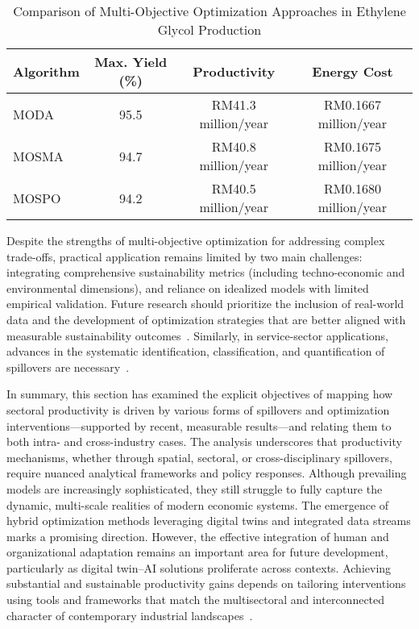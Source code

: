 \documentclass[sigconf]{acmart}
\begin{document}
\begin{table*}[htbp]
\centering
\caption{Comparison of Multi-Objective Optimization Approaches in Ethylene Glycol Production}
\label{tab:ethylene_glycol_optimization}
\begin{adjustbox}{max width=\textwidth}
\begin{tabular}{lccc}
\toprule
\textbf{Algorithm} & \textbf{Max. Yield (\%)} & \textbf{Productivity} & \textbf{Energy Cost} \\
\midrule
MODA  & 95.5 & RM41.3 million/year & RM0.1667 million/year \\
MOSMA & 94.7 & RM40.8 million/year & RM0.1675 million/year \\
MOSPO & 94.2 & RM40.5 million/year & RM0.1680 million/year \\
\bottomrule
\end{tabular}
\end{adjustbox}
\end{table*}

Despite the strengths of multi-objective optimization for addressing complex trade-offs, practical application remains limited by two main challenges: integrating comprehensive sustainability metrics (including techno-economic and environmental dimensions), and reliance on idealized models with limited empirical validation. Future research should prioritize the inclusion of real-world data and the development of optimization strategies that are better aligned with measurable sustainability outcomes~\cite{ref75}. Similarly, in service-sector applications, advances in the systematic identification, classification, and quantification of spillovers are necessary~\cite{ref75}.

In summary, this section has examined the explicit objectives of mapping how sectoral productivity is driven by various forms of spillovers and optimization interventions—supported by recent, measurable results—and relating them to both intra- and cross-industry cases. The analysis underscores that productivity mechanisms, whether through spatial, sectoral, or cross-disciplinary spillovers, require nuanced analytical frameworks and policy responses. Although prevailing models are increasingly sophisticated, they still struggle to fully capture the dynamic, multi-scale realities of modern economic systems. The emergence of hybrid optimization methods leveraging digital twins and integrated data streams marks a promising direction. However, the effective integration of human and organizational adaptation remains an important area for future development, particularly as digital twin–AI solutions proliferate across contexts. Achieving substantial and sustainable productivity gains depends on tailoring interventions using tools and frameworks that match the multisectoral and interconnected character of contemporary industrial landscapes~\cite{ref74}\cite{ref75}\cite{ref88}.
\end{document}
